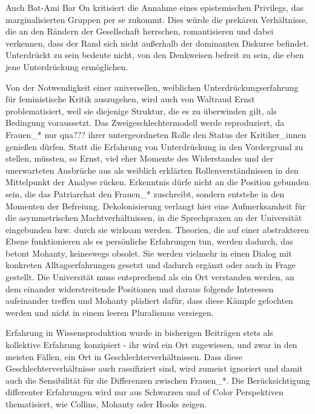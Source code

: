 Auch Bat-Ami Bar On kritisiert die Annahme eines epistemischen Privilegs, das
marginalisierten Gruppen per se zukommt. Dies würde die prekären Verhältnisse,
die an den Rändern der Gesellschaft herrschen, romantisieren und dabei
verkennen, dass der Rand sich nicht außerhalb der dominanten Diskurse befindet.
Unterdrückt zu sein bedeute nicht, von den Denkweisen befreit zu sein, die eben
jene Unterdrückung ermöglichen. \footnotemark {}

Von der Notwendigkeit einer universellen, weiblichen Unterdrückungserfahrung
für feministische Kritik auszugehen, wird auch von Waltraud Ernst
problematisiert, weil sie diejenige Struktur, die es zu überwinden gilt, als
Bedingung voraussetzt. Das Zweigeschlechtermodell werde reproduziert, da
Frauen\_* nur qua??? ihrer untergeordneten Rolle den Status der Kritiker\_innen
genießen dürfen. Statt die Erfahrung von Unterdrückung in den Vordergrund zu
stellen, müssten, so Ernst, viel eher Momente des Widerstandes und der
unerwarteten Ausbrüche aus als weiblich erklärten Rollenverständnissen in den
Mittelpunkt der Analyse rücken. Erkenntnis dürfe nicht an die Position gebunden
sein, die das Patriarchat den Frauen\_* zuschreibt, sondern entstehe in den
Momenten der Befreiung.\footnotemark {} Dekolonisierung verlangt hier eine
Aufmerksamkeit für die asymmetrischen Machtverhältnissen, in die Sprechpraxen
an der Universität eingebunden bzw. durch sie wirksam werden. Theorien, die auf
einer abstrakteren Ebene funktionieren als es persönliche Erfahrungen tun,
werden dadurch, das betont Mohanty, keineswegs obsolet. Sie werden vielmehr in
einen Dialog mit konkreten Alltagserfahrungen gesetzt und dadurch ergänzt oder
auch in Frage gestellt\footnotemark {}.  Die Universität muss entsprechend als ein Ort verstanden
werden, an dem einander widerstreitende Positionen und daraus folgende
Interessen aufeinander treffen und Mohanty plädiert dafür, dass diese Kämpfe
gefochten werden und nicht in einem leeren Pluralismus versiegen.
                      
Erfahrung in Wissensproduktion wurde in bisherigen Beiträgen stets als
kollektive Erfahrung konzipiert - ihr wird ein Ort zugewiesen, und zwar in den
meisten Fällen, ein Ort in Geschlechterverhältnissen. Dass diese
Geschlechterverhältnisse auch rassifiziert sind, wird zumeist ignoriert und
damit auch die Sensibilität für die Differenzen zwischen Frauen\_*. Die
Berücksichtigung differenter Erfahrungen wird nur aus Schwarzen und of Color
Perspektiven thematisiert, wie Collins, Mohanty oder Hooks zeigen.

